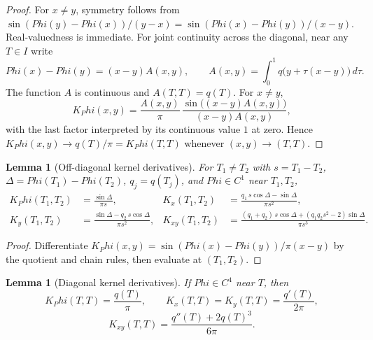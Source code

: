 \documentclass[11pt,a4paper]{amsart}
\def\Phi{Phi}%
\numberwithin{equation}{section}
\theoremstyle{plain}
\newtheorem{lemma}[theorem]{Lemma}
\theoremstyle{definition}
\newcommand{\Ph}{\Phi}
\newcommand{\Del}{\Delta}
\begin{document}
\begin{proof}
For \(x\ne y\), symmetry follows from
\(\sin(\Ph(y)-\Ph(x))/(y-x) = \sin(\Ph(x)-\Ph(y))/(x-y)\).
Real-valuedness is immediate.  For joint continuity across the
diagonal, near any \(T\in I\) write
\[
        \Ph(x)-\Ph(y)=(x-y)A(x,y),\qquad
        A(x,y)=\int_0^1 q\bigl(y+\tau(x-y)\bigr)\,d\tau.
\]
The function \(A\) is continuous and \(A(T,T)=q(T)\).  For \(x\ne y\),
\[
        K_\Ph(x,y)
        =\frac{A(x,y)}{\pi}\,
          \frac{\sin\bigl((x-y)A(x,y)\bigr)}
               {(x-y)A(x,y)},
\]
with the last factor interpreted by its continuous value \(1\) at zero.
Hence \(K_\Ph(x,y)\to q(T)/\pi=K_\Ph(T,T)\) whenever
\((x,y)\to(T,T)\).
\end{proof}

\begin{lemma}[Off-diagonal kernel derivatives]
\label{lem:phase-kernel-derivatives}
For \(T_1\ne T_2\) with \(s=T_1-T_2\), \(\Del=\Ph(T_1)-\Ph(T_2)\),
\(q_j=q(T_j)\), and \(\Ph\in C^1\) near \(T_1, T_2\),
\begin{align*}
K_\Ph(T_1,T_2) &= \frac{\sin\Del}{\pi s},
&K_x(T_1,T_2) &= \frac{q_1\,s\cos\Del - \sin\Del}{\pi s^2},\\
K_y(T_1,T_2) &= \frac{\sin\Del - q_2\,s\cos\Del}{\pi s^2},
&K_{xy}(T_1,T_2)
&= \frac{(q_1+q_2)\,s\cos\Del + (q_1 q_2 s^2 - 2)\sin\Del}{\pi s^3}.
\end{align*}
\end{lemma}

\begin{proof}
Differentiate \(K_\Ph(x,y) = \sin(\Ph(x)-\Ph(y))/\pi(x-y)\) by the
quotient and chain rules, then evaluate at \((T_1, T_2)\).
\end{proof}

\begin{lemma}[Diagonal kernel derivatives]
\label{lem:phase-kernel-diagonal-derivatives}
If \(\Ph\in C^4\) near \(T\), then
\begin{equation}
\label{eq:diagonal-kernel-derivatives}
K_\Ph(T,T)=\frac{q(T)}{\pi},\qquad
K_x(T,T)=K_y(T,T)=\frac{q'(T)}{2\pi},
\end{equation}
\[
        K_{xy}(T,T)=\frac{q''(T)+2q(T)^3}{6\pi}.
\]
\end{lemma}
\end{document}
